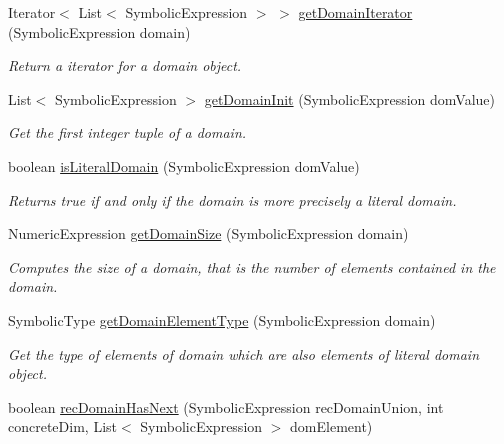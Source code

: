 \begin{DoxyCompactItemize}
Iterator$<$ List$<$ Symbolic\+Expression $>$ $>$ \hyperlink{classedu_1_1udel_1_1cis_1_1vsl_1_1civl_1_1dynamic_1_1common_1_1CommonSymbolicUtility_a1137c18944ee518692048162a18dacfd}{get\+Domain\+Iterator} (Symbolic\+Expression domain)
\begin{DoxyCompactList}\small\item\em Return a iterator for a domain object. \end{DoxyCompactList}\item 
List$<$ Symbolic\+Expression $>$ \hyperlink{classedu_1_1udel_1_1cis_1_1vsl_1_1civl_1_1dynamic_1_1common_1_1CommonSymbolicUtility_afb7607f502a2433dfbf49bfefb8daa3e}{get\+Domain\+Init} (Symbolic\+Expression dom\+Value)
\begin{DoxyCompactList}\small\item\em Get the first integer tuple of a domain. \end{DoxyCompactList}\item 
boolean \hyperlink{classedu_1_1udel_1_1cis_1_1vsl_1_1civl_1_1dynamic_1_1common_1_1CommonSymbolicUtility_aee865fd0d3f2b529eb2926faabe47231}{is\+Literal\+Domain} (Symbolic\+Expression dom\+Value)
\begin{DoxyCompactList}\small\item\em Returns true if and only if the domain is more precisely a literal domain. \end{DoxyCompactList}\item 
Numeric\+Expression \hyperlink{classedu_1_1udel_1_1cis_1_1vsl_1_1civl_1_1dynamic_1_1common_1_1CommonSymbolicUtility_a91190f8c425dfddddd8e4f737c3190f6}{get\+Domain\+Size} (Symbolic\+Expression domain)
\begin{DoxyCompactList}\small\item\em Computes the size of a domain, that is the number of elements contained in the domain. \end{DoxyCompactList}\item 
Symbolic\+Type \hyperlink{classedu_1_1udel_1_1cis_1_1vsl_1_1civl_1_1dynamic_1_1common_1_1CommonSymbolicUtility_a887ef1fd00bb8adfc7d6811fa08e788e}{get\+Domain\+Element\+Type} (Symbolic\+Expression domain)
\begin{DoxyCompactList}\small\item\em Get the type of elements of domain which are also elements of literal domain object. \end{DoxyCompactList}\item 
boolean \hyperlink{classedu_1_1udel_1_1cis_1_1vsl_1_1civl_1_1dynamic_1_1common_1_1CommonSymbolicUtility_a6defcd99c6e48b08ba6ebb4f544c24f0}{rec\+Domain\+Has\+Next} (Symbolic\+Expression rec\+Domain\+Union, int concrete\+Dim, List$<$ Symbolic\+Expression $>$ dom\+Element)

\end{DoxyCompactItemize}
